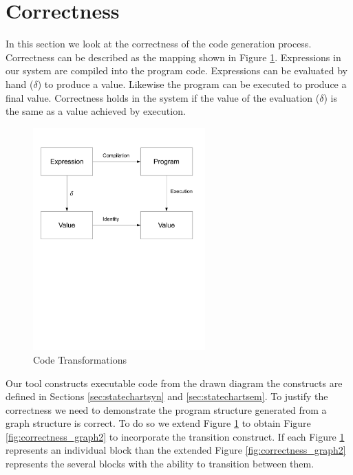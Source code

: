 \section{Correctness}

In this section we look at the correctness of the code generation process. Correctness can be described as the mapping shown in Figure \ref{fig:correctness_graph1}. Expressions in our system are compiled into the program code. Expressions can be evaluated by hand ($\delta$) to produce a value. Likewise the program can be executed to produce a final value. Correctness holds in the system if the value of the evaluation ($\delta$) is the 
same as a value achieved by execution.

\begin{figure}[htb]
    \centering
    \includegraphics[trim= 10mm 120mm 10mm 10mm, clip, width=250px]{./images/correctness_graph1.pdf}
    \caption{Code Transformations}
    \label{fig:correctness_graph1}
\end{figure}

Our tool constructs executable code from the drawn diagram the constructs are 
defined in Sections \ref{sec:statechartsyn} and \ref{sec:statechartsem}. To justify 
the correctness we need 
to demonstrate the program structure generated from a graph structure is correct. 
To do so we extend Figure \ref{fig:correctness_graph1} to obtain 
Figure \ref{fig:correctness_graph2} to incorporate the transition construct. 
If each Figure \ref{fig:correctness_graph1} represents an individual block 
than the extended Figure \ref{fig:correctness_graph2} represents the several 
blocks with the ability to transition between them.

